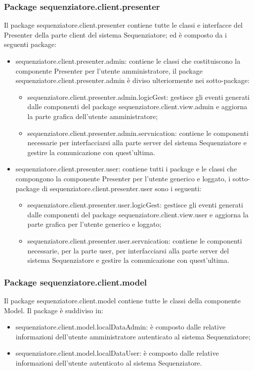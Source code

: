 \subsubsection{Package sequenziatore.client.presenter}
Il package sequenziatore.client.presenter contiene tutte le classi e interfacce del Presenter della 
parte client del sistema Sequenziatore; ed è composto da i seguenti package:
\begin{itemize}
	\item sequenziatore.client.presenter.admin: contiene le classi che costituiscono la componente Presenter
per l’utente amministratore, il package sequenziatore.client.presenter.admin è diviso ulteriormente nei sotto-package:
	\begin{itemize}
		\item sequenziatore.client.presenter.admin.logicGest: gestisce gli eventi generati dalle componenti del package
sequenziatore.client.view.admin e aggiorna la parte grafica dell'utente amministratore;
		\item sequenziatore.client.presenter.admin.servnication: contiene le componenti necessarie per interfacciarsi alla parte server del sistema Sequenziatore e gestire la comunicazione con quest'ultima.
	\end{itemize}
	\item sequenziatore.client.presenter.user: contiene tutti i package e le classi che compongono la componente Presenter
per l’utente generico e loggato, i sotto-package di sequenziatore.client.presenter.user sono i seguenti:
	\begin{itemize}
		\item sequenziatore.client.presenter.user.logicGest: gestisce gli eventi generati dalle componenti del package
sequenziatore.client.view.user e aggiorna la parte grafica per l'utente generico e loggato;
		\item sequenziatore.client.presenter.user.servnication: contiene le componenti necessarie, per la parte user, per interfacciarsi alla parte server del sistema Sequenziatore e gestire la comunicazione con quest'ultima.
	\end{itemize}
\end{itemize}
\subsubsection{Package sequenziatore.client.model}
Il package sequenziatore.client.model contiene tutte le classi della componente Model. 
Il package è suddiviso in:
\begin{itemize}
	\item sequenziatore.client.model.localDataAdmin: è composto dalle relative informazioni dell'utente amministratore autenticato al sistema Sequenziatore;
	\item sequenziatore.client.model.localDataUser: è composto dalle relative informazioni dell'utente autenticato al sistema Sequenziatore.
\end{itemize}
